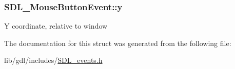 \subsubsection[{y}]{ S\+D\+L\+\_\+\+Mouse\+Button\+Event\+::y}\label{struct_s_d_l___mouse_button_event_a7ccb5c55a7ddadce723f4ea6d5269540}
Y coordinate, relative to window 

The documentation for this struct was generated from the following file\+:\begin{DoxyCompactItemize}
\item 
lib/gdl/includes/\hyperlink{_s_d_l__events_8h}{S\+D\+L\+\_\+events.\+h}\end{DoxyCompactItemize}
